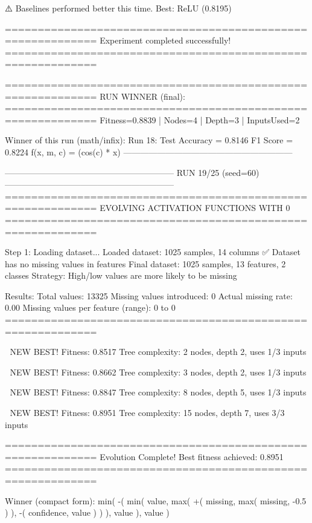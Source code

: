⚠️ Baselines performed better this time.
   Best: ReLU (0.8195)

============================================================
Experiment completed successfully!
============================================================

============================================================
RUN WINNER (final):
============================================================
Fitness=0.8839 | Nodes=4 | Depth=3 | InputsUsed=2

Winner of this run (math/infix):
  Run 18:
     Test Accuracy = 0.8146
     F1 Score      = 0.8224
     f(x, m, c)    = (cos(c) * x)
------------------------------------------------------------

------------------------------------------------------------
RUN 19/25 (seed=60)
------------------------------------------------------------
============================================================
EVOLVING ACTIVATION FUNCTIONS
WITH 0%
============================================================

Step 1: Loading dataset...
Loaded dataset: 1025 samples, 14 columns
✅ Dataset has no missing values in features
Final dataset: 1025 samples, 13 features, 2 classes
Strategy: High/low values are more likely to be missing

Results:
  Total values: 13325
  Missing values introduced: 0
  Actual missing rate: 0.00%
  Missing values per feature (range): 0 to 0
============================================================


🎯 NEW BEST! Fitness: 0.8517
Tree complexity: 2 nodes, depth 2, uses 1/3 inputs

🎯 NEW BEST! Fitness: 0.8662
Tree complexity: 3 nodes, depth 2, uses 1/3 inputs

🎯 NEW BEST! Fitness: 0.8847
Tree complexity: 8 nodes, depth 5, uses 1/3 inputs

🎯 NEW BEST! Fitness: 0.8951
Tree complexity: 15 nodes, depth 7, uses 3/3 inputs

============================================================
Evolution Complete!
Best fitness achieved: 0.8951
============================================================

Winner (compact form):
 min(
  -(
    min(
      value,
      max(
        +(
          missing,
          max(
            missing,
            -0.5
          )
        ),
        -(
          confidence,
          value
        )
      )
    ),
    value
  ),
  value
)

